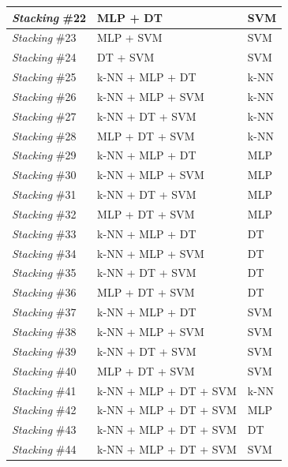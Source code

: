 \begin{longtable}{l|l|l}
\textit{Stacking} \#22 & MLP   + DT              & SVM  \\ \hline
\textit{Stacking} \#23 & MLP + SVM               & SVM  \\ \hline
\textit{Stacking} \#24 & DT   + SVM              & SVM  \\ \hline
\textit{Stacking} \#25 & k-NN + MLP + DT         & k-NN \\ \hline
\textit{Stacking} \#26 & k-NN   + MLP + SVM      & k-NN \\ \hline
\textit{Stacking} \#27 & k-NN + DT + SVM         & k-NN \\ \hline
\textit{Stacking} \#28 & MLP   + DT + SVM        & k-NN \\ \hline
\textit{Stacking} \#29 & k-NN + MLP + DT         & MLP  \\ \hline
\textit{Stacking} \#30 & k-NN   + MLP + SVM      & MLP  \\ \hline
\textit{Stacking} \#31 & k-NN + DT + SVM         & MLP  \\ \hline
\textit{Stacking} \#32 & MLP   + DT + SVM        & MLP  \\ \hline
\textit{Stacking} \#33 & k-NN + MLP + DT         & DT   \\ \hline
\textit{Stacking} \#34 & k-NN   + MLP + SVM      & DT   \\ \hline
\textit{Stacking} \#35 & k-NN + DT + SVM         & DT   \\ \hline
\textit{Stacking} \#36 & MLP   + DT + SVM        & DT   \\ \hline
\textit{Stacking} \#37 & k-NN + MLP + DT         & SVM  \\ \hline
\textit{Stacking} \#38 & k-NN   + MLP + SVM      & SVM  \\ \hline
\textit{Stacking} \#39 & k-NN + DT + SVM         & SVM  \\ \hline
\textit{Stacking} \#40 & MLP   + DT + SVM        & SVM  \\ \hline
\textit{Stacking} \#41 & k-NN + MLP + DT + SVM   & k-NN \\ \hline
\textit{Stacking} \#42 & k-NN   + MLP + DT + SVM & MLP  \\ \hline
\textit{Stacking} \#43 & k-NN + MLP + DT + SVM   & DT   \\ \hline
\textit{Stacking} \#44 & k-NN   + MLP + DT + SVM & SVM  \\ \hline

\end{longtable}









